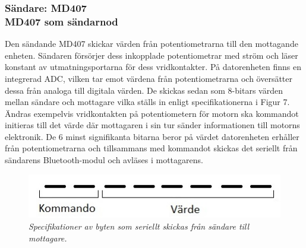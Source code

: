 \documentclass[a4paper]{article}
\begin{document}
\subsubsection{Sändare: MD407 \\ MD407 som sändarnod}
Den sändande MD407 skickar värden från potentiometrarna till den mottagande enheten. Sändaren försörjer dess inkopplade potentiometrar med ström och läser konstant av utmatningsportarna för dess vridkontakter. På datorenheten finns en integrerad ADC, vilken tar emot värdena från potentiometrarna och översätter dessa från analoga till digitala värden. De skickas sedan som 8-bitars värden mellan sändare och mottagare vilka ställs in enligt specifikationerna i Figur 7. Ändras exempelvis vridkontakten på potentiometern för motorn ska kommandot initieras till det värde där mottagaren i sin tur sänder informationen till motorns elektronik. De 6 minst signifikanta bitarna beror på värdet datorenheten erhåller från potentiometrarna och tillsammans med kommandot skickas det seriellt från sändarens Bluetooth-modul och avläses i mottagarens.


\begin{figure}[H]
\includegraphics[scale=1]{aByteComVal.jpg}
\centering
\caption{\it Specifikationer av byten som seriellt skickas från sändare till mottagare.}
\end{figure} 





\end{document}
